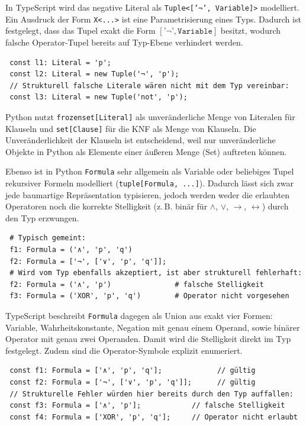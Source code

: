 In TypeScript wird das negative Literal als \texttt{Tuple<['¬', Variable]>} modelliert. Ein Ausdruck der Form \texttt{X<...>} ist eine Parametrisierung eines Typs. Dadurch ist festgelegt, dass das Tupel exakt die Form \([\texttt{'¬'}, \texttt{Variable}]\) besitzt, wodurch falsche Operator-Tupel bereits auf Typ-Ebene verhindert werden.

\begin{verbatim}
 const l1: Literal = 'p';
 const l2: Literal = new Tuple('¬', 'p');
 // Strukturell falsche Literale wären nicht mit dem Typ vereinbar:
 const l3: Literal = new Tuple('not', 'p');
\end{verbatim}

Python nutzt \texttt{frozenset[Literal]} als unveränderliche Menge von Literalen für Klauseln und \texttt{set[Clause]} für die \ac{KNF} als Menge von Klauseln. Die Unveränderlichkeit der Klauseln ist entscheidend, weil nur unveränderliche Objekte in Python als Elemente einer äußeren Menge (Set) auftreten können.

Ebenso ist in Python \texttt{Formula} sehr allgemein als Variable oder beliebiges Tupel rekursiver Formeln modelliert (\texttt{tuple[Formula, ...]}). Dadurch lässt sich zwar jede baumartige Repräsentation typisieren, jedoch werden weder die erlaubten Operatoren noch die korrekte Stelligkeit (z.\,B. binär für \(\land\), \(\lor\), \(\to\), \(\leftrightarrow\)) durch den Typ erzwungen.

\begin{verbatim}
 # Typisch gemeint:
 f1: Formula = ('∧', 'p', 'q')
 f2: Formula = ['¬', ['∨', 'p', 'q']];
 # Wird vom Typ ebenfalls akzeptiert, ist aber strukturell fehlerhaft:
 f2: Formula = ('∧', 'p')               # falsche Stelligkeit
 f3: Formula = ('XOR', 'p', 'q')        # Operator nicht vorgesehen
\end{verbatim}

TypeScript beschreibt \texttt{Formula} dagegen als Union aus exakt vier Formen: Variable, Wahrheitskonstante, Negation mit genau einem Operand, sowie binärer Operator mit genau zwei Operanden. Damit wird die Stelligkeit direkt im Typ festgelegt. Zudem sind die Operator-Symbole explizit enumeriert.

\begin{verbatim}
 const f1: Formula = ['∧', 'p', 'q'];             // gültig
 const f2: Formula = ['¬', ['∨', 'p', 'q']];      // gültig
 // Strukturelle Fehler würden hier bereits durch den Typ auffallen:
 const f3: Formula = ['∧', 'p'];            // falsche Stelligkeit
 const f4: Formula = ['XOR', 'p', 'q'];     // Operator nicht erlaubt
\end{verbatim}


